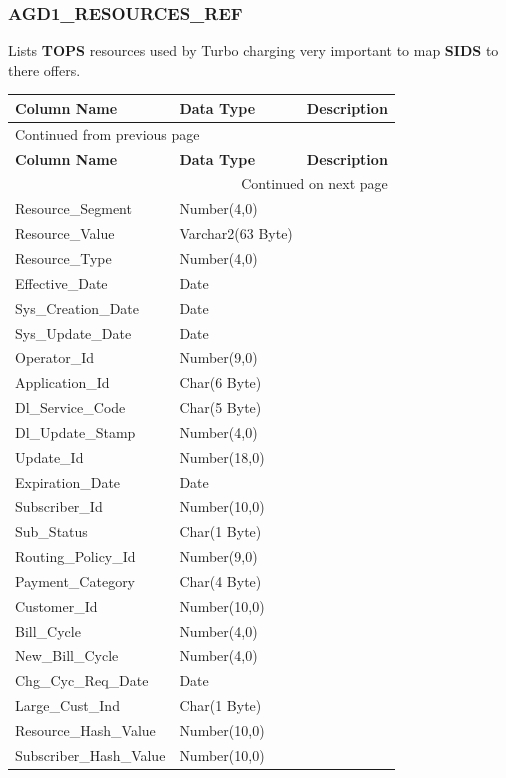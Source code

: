\documentclass[12pt,twoside]{article}
\begin{document}
\subsubsection{AGD1\_RESOURCES\_REF}
\label{sec:orgheadline40}
Lists \textbf{TOPS} resources used by Turbo charging very important to map \textbf{SIDS} to there offers.
\footnotesize
\begin{longtable}{l|l|l}
\hline
\textbf{Column Name} & \textbf{Data Type} & \textbf{Description}\\
\hline
\endfirsthead
\multicolumn{3}{l}{Continued from previous page} \\
\hline

\textbf{Column Name} & \textbf{Data Type} & \textbf{Description} \\

\hline
\endhead
\hline\multicolumn{3}{r}{Continued on next page} \\
\endfoot
\endlastfoot
\hline
Resource\_Segment & Number(4,0) & \\
Resource\_Value & Varchar2(63 Byte) & \\
Resource\_Type & Number(4,0) & \\
Effective\_Date & Date & \\
Sys\_Creation\_Date & Date & \\
Sys\_Update\_Date & Date & \\
Operator\_Id & Number(9,0) & \\
Application\_Id & Char(6 Byte) & \\
Dl\_Service\_Code & Char(5 Byte) & \\
Dl\_Update\_Stamp & Number(4,0) & \\
Update\_Id & Number(18,0) & \\
Expiration\_Date & Date & \\
Subscriber\_Id & Number(10,0) & \\
Sub\_Status & Char(1 Byte) & \\
Routing\_Policy\_Id & Number(9,0) & \\
Payment\_Category & Char(4 Byte) & \\
Customer\_Id & Number(10,0) & \\
Bill\_Cycle & Number(4,0) & \\
New\_Bill\_Cycle & Number(4,0) & \\
Chg\_Cyc\_Req\_Date & Date & \\
Large\_Cust\_Ind & Char(1 Byte) & \\
Resource\_Hash\_Value & Number(10,0) & \\
Subscriber\_Hash\_Value & Number(10,0) & \\
\hline
\end{longtable}
\normalsize
\end{document}
